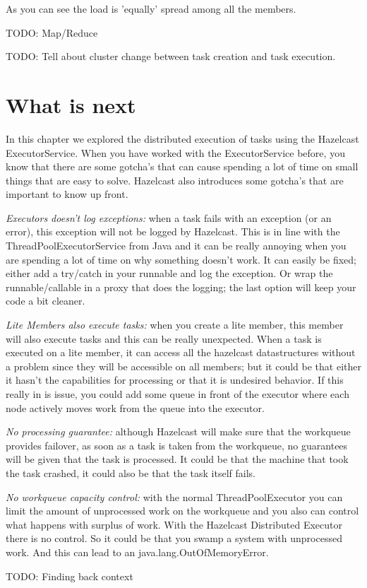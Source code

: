 As you can see the load is 'equally' spread among all the members. 

TODO: Map/Reduce

TODO: Tell about cluster change between task creation and task execution.

\section{What is next}
In this chapter we explored the distributed execution of tasks using the Hazelcast ExecutorService. When you have worked with the ExecutorService before, you know that there are some gotcha's that can cause spending a lot of time on small things that are easy to solve. Hazelcast also introduces some gotcha's that are important to know up front.

\emph{Executors doesn't log exceptions:} when a task fails with an exception (or an error), this exception will not be logged by Hazelcast. This is in line with the ThreadPoolExecutorService from Java and it can be really annoying when you are spending a lot of time on why something doesn't work. It can easily be fixed; either add a try/catch in your runnable and log the exception. Or wrap the runnable/callable in a proxy that does the logging; the last option will keep your code a bit cleaner. 

\emph{Lite Members also execute tasks:} when you create a lite member, this member will also execute tasks and this can be really unexpected. When a task is executed on a lite member, it can access all the hazelcast datastructures without a problem since they will be accessible on all members; but it could be that either it hasn't the capabilities for processing or that it is undesired behavior. If this really in is issue, you could add some queue in front of the executor where each node actively moves work from the queue into the executor.

\emph{No processing guarantee:} although Hazelcast will make sure that the workqueue provides failover, as soon as a task is taken from the workqueue, no guarantees will be given that the task is processed. It could be that the machine that took the task crashed, it could also be that the task itself fails. 

\emph{No workqueue capacity control:} with the normal ThreadPoolExecutor you can limit the amount of unprocessed work on the workqueue and you also can control what happens with surplus of work. With the Hazelcast Distributed Executor there is no control. So it could be that you swamp a system with unprocessed work. And this can lead to an java.lang.OutOfMemoryError.

TODO: Finding back context

